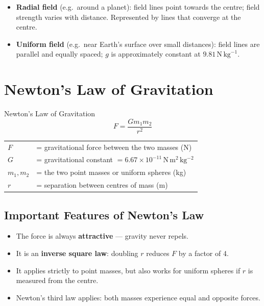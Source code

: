 \begin{itemize}
  \item \textbf{Radial field} (e.g.\ around a planet): field lines point towards the
        centre; field strength varies with distance. Represented by lines that converge
        at the centre.
  \item \textbf{Uniform field} (e.g.\ near Earth's surface over small distances):
        field lines are parallel and equally spaced; $g$ is approximately constant at
        $9.81\,\mathrm{N\,kg}^{-1}$.
\end{itemize}

\section{Newton's Law of Gravitation}

\begin{formulabox}{Newton's Law of Gravitation}
\begin{equation}
  F = \frac{Gm_1 m_2}{r^2}
\end{equation}
\begin{tabular}{ll}
$F$       & = gravitational force between the two masses (N) \\
$G$       & = gravitational constant $= 6.67\times10^{-11}\,\mathrm{N\,m^2\,kg^{-2}}$ \\
$m_1,m_2$ & = the two point masses or uniform spheres (kg) \\
$r$       & = separation between centres of mass (m) \\
\end{tabular}
\end{formulabox}

\subsection{Important Features of Newton's Law}
\begin{itemize}
  \item The force is always \textbf{attractive} — gravity never repels.
  \item It is an \textbf{inverse square law}: doubling $r$ reduces $F$ by a factor
        of 4.
  \item It applies strictly to point masses, but also works for uniform spheres if
        $r$ is measured from the centre.
  \item Newton's third law applies: both masses experience equal and opposite forces.
\end{itemize}

